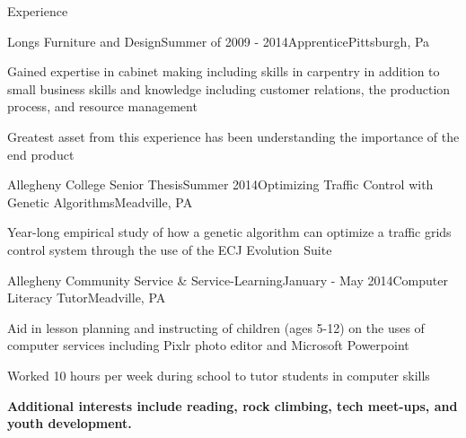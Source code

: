 \documentclass{resume} %
\begin{document}
\begin{rSection}{Experience}
\begin{rSubsection}{Longs Furniture and Design}{Summer of 2009 - 2014}{Apprentice}{Pittsburgh, Pa}
\item Gained expertise in cabinet making including skills in carpentry  in addition to small business skills and knowledge including customer relations, the production process, and resource management
\item Greatest asset from this experience has been understanding the importance of the end product
\end{rSubsection}
\begin{rSubsection}{Allegheny College Senior Thesis}{Summer 2014}{Optimizing Traffic Control with Genetic Algorithms}{Meadville, PA}
\item Year-long empirical study of how a genetic algorithm can optimize a traffic grids control system through the use of the ECJ Evolution Suite
\end{rSubsection}
\begin{rSubsection}{Allegheny Community Service \& Service-Learning}{January - May 2014}{Computer Literacy Tutor}{Meadville, PA}
\item Aid in lesson planning and instructing of children (ages 5-12) on the uses of computer services including Pixlr photo editor and Microsoft Powerpoint
\item Worked 10 hours per week during school to tutor students in computer skills
\end{rSubsection}

\vspace{5mm}
\textbf{Additional interests include reading, rock climbing, tech meet-ups, and youth development.}




\end{rSection}
\end{document}
